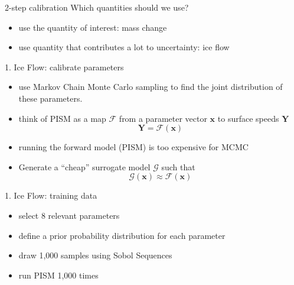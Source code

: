 \documentclass[hide notes,intlimits]{beamer}
\begin{document}
\begin{frame}{2-step calibration}
Which quantities should we use?
\begin{itemize}
\item use the quantity of interest: mass change
\item use quantity that contributes a lot to uncertainty: ice flow
\end{itemize}
\note[item]{}
\end{frame}

\begin{frame}{1. Ice Flow: calibrate parameters}
\begin{itemize}
\item use Markov Chain Monte Carlo sampling to find the joint distribution of these parameters.
\item think of PISM as a map $\mathcal{F}$ from a parameter vector $\mathbf{x}$ to surface speeds $\mathbf{Y}$
\begin{equation}
\mathbf{Y} = \mathcal{F}(\mathbf{x})
\end{equation}
\item running the forward model (PISM) is too expensive for MCMC
\item Generate a ``cheap'' surrogate model $\mathcal{G}$ such that
\begin{equation}
\mathcal{G}(\mathbf{x}) \approx \mathcal{F}(\mathbf{x})
\end{equation}
\end{itemize}

\end{frame}

\begin{frame}{1. Ice Flow: training data}
\begin{itemize}
\item select 8 relevant parameters
\item define a prior probability distribution for each parameter
\item draw 1,000 samples using Sobol Sequences
\item run PISM 1,000 times
\end{itemize}
\end{frame}
\end{document}
